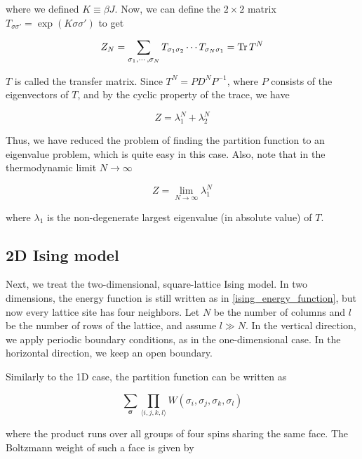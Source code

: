 where we defined $K \equiv \beta J$. Now, we can define
the $2 \times 2$ matrix $T_{\sigma \sigma'} = \exp(K \sigma \sigma')$ to get

\begin{equation}
  Z_N = \sum_{\sigma_1, \cdots, \sigma_N} T_{\sigma_1 \sigma_2} \dotsm T_{\sigma_N \sigma_1} = \operatorname{Tr} T^N
\end{equation}

$T$ is called the transfer matrix. Since $T^N = P D^N P^{-1}$, where $P$
consists of the eigenvectors of $T$, and by the cyclic property of the trace, we
have

\begin{equation}
  Z = \lambda_{1}^{N} + \lambda_{2}^{N}
\end{equation}

Thus, we have reduced the problem of finding the partition function to an
eigenvalue problem, which is quite easy in this case. Also, note that in the thermodynamic limit $N \to \infty$

\begin{equation}
  Z = \lim_{N \to \infty} \lambda_{1}^{N}
\end{equation}

where $\lambda_1$ is the non-degenerate largest eigenvalue (in absolute value) of $T$.

\subsection{2D Ising model}

Next, we treat the two-dimensional, square-lattice Ising model. In two
dimensions, the energy function is still written as in
\eqref{ising_energy_function}, but now every lattice site has four neighbors.
Let $N$ be the number of columns and $l$ be the number of rows of the lattice, and assume 
$l \gg N$. In the vertical direction, we apply periodic boundary conditions, as in the one-dimensional case.
In the horizontal direction, we keep an open boundary.

Similarly to the 1D case, the partition function can be written as 

\begin{equation}
  \sum_{\bm{\sigma}} \prod_{\langle i, j, k, l \rangle} W(\sigma_i, \sigma_j, \sigma_k, \sigma_l)
\end{equation}

where the product runs over all groups of four spins sharing the same face. The Boltzmann weight of such a face is given by

